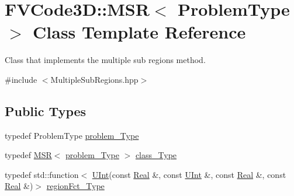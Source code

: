 \hypertarget{classFVCode3D_1_1MSR}{}\section{F\+V\+Code3D\+:\+:M\+SR$<$ Problem\+Type $>$ Class Template Reference}
\label{classFVCode3D_1_1MSR}


Class that implements the multiple sub regions method.  




{\ttfamily \#include $<$Multiple\+Sub\+Regions.\+hpp$>$}

\subsection*{Public Types}
\begin{DoxyCompactItemize}
\item 
typedef Problem\+Type \hyperlink{classFVCode3D_1_1MSR_aee0f8176a894e4f695baa08af10d14cf}{problem\+\_\+\+Type}
\item 
typedef \hyperlink{classFVCode3D_1_1MSR}{M\+SR}$<$ \hyperlink{classFVCode3D_1_1MSR_aee0f8176a894e4f695baa08af10d14cf}{problem\+\_\+\+Type} $>$ \hyperlink{classFVCode3D_1_1MSR_a88e19436275c5ca4ed6629c2a3bb8480}{class\+\_\+\+Type}
\item 
typedef std\+::function$<$ \hyperlink{namespaceFVCode3D_a4bf7e328c75d0fd504050d040ebe9eda}{U\+Int}(const \hyperlink{namespaceFVCode3D_a40c1f5588a248569d80aa5f867080e83}{Real} \&, const \hyperlink{namespaceFVCode3D_a4bf7e328c75d0fd504050d040ebe9eda}{U\+Int} \&, const \hyperlink{namespaceFVCode3D_a40c1f5588a248569d80aa5f867080e83}{Real} \&, const \hyperlink{namespaceFVCode3D_a40c1f5588a248569d80aa5f867080e83}{Real} \&)$>$ \hyperlink{classFVCode3D_1_1MSR_aebe9d4e9bbcc367d79b0aae7b794c5a6}{region\+Fct\+\_\+\+Type}
\end{DoxyCompactItemize}
